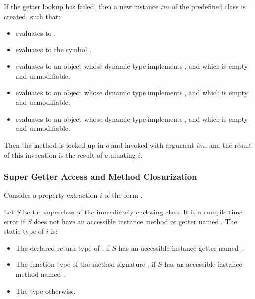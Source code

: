 \documentclass[makeidx]{article}
\begin{document}
{\LMHash{}%
If the getter lookup has failed,
then a new instance $im$ of the predefined class  is created,
such that:
\begin{itemize}
\item {} evaluates to \TRUE.
\item {} evaluates to the symbol .
\item {} evaluates to an object
  whose dynamic type implements ,
  and which is empty and unmodifiable.
\item {} evaluates to an object
  whose dynamic type implements ,
  and which is empty and unmodifiable.
\item {} evaluates to an object
  whose dynamic type implements ,
  and which is empty and unmodifiable.
\end{itemize}

\LMHash{}%
Then the method  is looked up
in $o$ and invoked with argument $im$,
and the result of this invocation is the result of evaluating $i$.



\subsubsection{Super Getter Access and Method Closurization}

\LMHash{}%
Consider a property extraction $i$ of the form .

\LMHash{}%
Let $S$ be the superclass of the immediately enclosing class.
It is a compile-time error if $S$ does not have
an accessible instance method or getter named \id.
The static type of $i$ is:

\begin{itemize}
\item The declared return type of ,
  if $S$ has an accessible instance getter named \id.
\item The function type of the method signature ,
  if $S$ has an accessible instance method named \id.
\item The type \DYNAMIC{} otherwise.
\end{itemize}

}
\end{document}
